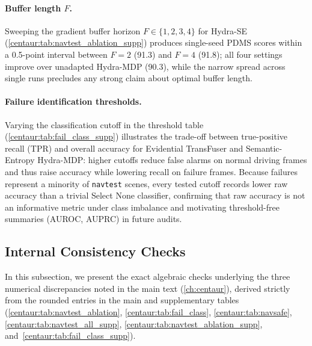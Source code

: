 \paragraph{Buffer length $F$.} Sweeping the gradient buffer horizon $F \in \{1,2,3,4\}$ for Hydra-SE (\ref{centaur:tab:navtest_ablation_supp}) produces single-seed PDMS scores within a 0.5-point interval between $F=2$ (91.3) and $F=4$ (91.8); all four settings improve over unadapted Hydra-MDP (90.3), while the narrow spread across single runs precludes any strong claim about optimal buffer length.

\paragraph{Failure identification thresholds.} Varying the classification cutoff in the threshold table (\ref{centaur:tab:fail_class_supp}) illustrates the trade-off between true-positive recall (TPR) and overall accuracy for Evidential TransFuser and Semantic-Entropy Hydra-MDP: higher cutoffs reduce false alarms on normal driving frames and thus raise accuracy while lowering recall on failure frames. Because failures represent a minority of \texttt{navtest} scenes, every tested cutoff records lower raw accuracy than a trivial Select None classifier, confirming that raw accuracy is not an informative metric under class imbalance and motivating threshold-free summaries (AUROC, AUPRC) in future audits.

\subsection{Internal Consistency Checks}\label{centaur:app:consistency}

In this subsection, we present the exact algebraic checks underlying the three numerical discrepancies noted in the main text (\ref{ch:centaur}), derived strictly from the rounded entries in the main and supplementary tables (\ref{centaur:tab:navtest_ablation}, \ref{centaur:tab:fail_class}, \ref{centaur:tab:navsafe}, \ref{centaur:tab:navtest_all_supp}, \ref{centaur:tab:navtest_ablation_supp}, and~\ref{centaur:tab:fail_class_supp}).

